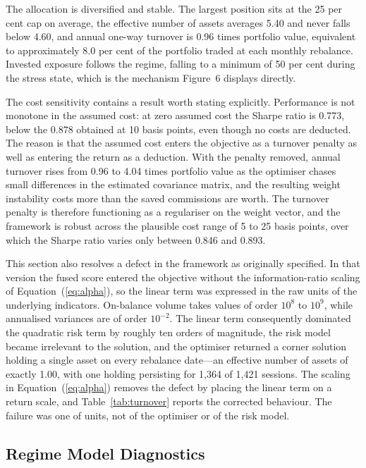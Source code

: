 \documentclass{singlecol-new}
\theoremstyle{TH}{
\newtheorem{lemma}{Lemma}
\newtheorem{theorem}[lemma]{Theorem}
\newtheorem{corrolary}[lemma]{Corrolary}
\newtheorem{conjecture}[lemma]{Conjecture}
\newtheorem{proposition}[lemma]{Proposition}
\newtheorem{claim}[lemma]{Claim}
\newtheorem{stheorem}[lemma]{Wrong Theorem}
\newtheorem{algorithm}{Algorithm}
}
\theoremstyle{THrm}{
\newtheorem{definition}{Definition}[section]
\newtheorem{question}{Question}[section]
\newtheorem{remark}{Remark}
\newtheorem{scheme}{Scheme}
}
\theoremstyle{THhit}{
\newtheorem{case}{Case}[section]
}
\begin{document}
The allocation is diversified and stable. The largest position sits at the 25 per cent
cap on average, the effective number of assets averages 5.40 and never falls below
4.60, and annual one-way turnover is 0.96 times portfolio value, equivalent to
approximately 8.0 per cent of the portfolio traded at each monthly rebalance. Invested
exposure follows the regime, falling to a minimum of 50 per cent during the stress
state, which is the mechanism Figure~6 displays directly.

The cost sensitivity contains a result worth stating explicitly. Performance is not
monotone in the assumed cost: at zero assumed cost the Sharpe ratio is 0.773, below the
0.878 obtained at 10 basis points, even though no costs are deducted. The reason is
that the assumed cost enters the objective as a turnover penalty as well as entering
the return as a deduction. With the penalty removed, annual turnover rises from
0.96 to 4.04 times portfolio value as the optimiser chases small differences in the
estimated covariance matrix, and the resulting weight instability costs more than the
saved commissions are worth. The turnover penalty is therefore functioning as a
regulariser on the weight vector, and the framework is robust across the plausible cost
range of 5 to 25 basis points, over which the Sharpe ratio varies only between 0.846
and 0.893.

This section also resolves a defect in the framework as originally specified. In that
version the fused score entered the objective without the information-ratio scaling of
Equation~(\ref{eq:alpha}), so the linear term was expressed in the raw units of the
underlying indicators. On-balance volume takes values of order $10^{8}$ to $10^{9}$,
while annualised variances are of order $10^{-2}$. The linear term consequently
dominated the quadratic risk term by roughly ten orders of magnitude, the risk model
became irrelevant to the solution, and the optimiser returned a corner solution holding
a single asset on every rebalance date---an effective number of assets of exactly 1.00,
with one holding persisting for 1{,}364 of 1{,}421 sessions. The scaling in
Equation~(\ref{eq:alpha}) removes the defect by placing the linear term on a return
scale, and Table~\ref{tab:turnover} reports the corrected behaviour. The failure was one of units, not
of the optimiser or of the risk model.

\subsection{Regime Model Diagnostics}
\label{sec:regimefit}
\end{document}
